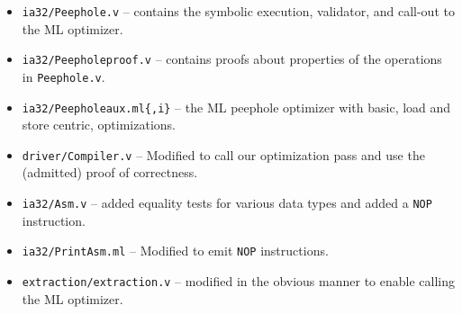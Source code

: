 \documentclass{article}
\begin{document}
\begin{itemize}
\item {\tt ia32/Peephole.v} -- contains the symbolic execution,
  validator, and call-out to the ML optimizer.
\item {\tt ia32/Peepholeproof.v} -- contains proofs about
  properties of the operations in {\tt Peephole.v}.
\item {\tt ia32/Peepholeaux.ml\{,i\}} -- the ML peephole
  optimizer with basic, load and store centric, optimizations.
\item {\tt driver/Compiler.v} -- Modified to call our
  optimization pass and use the (admitted) proof of correctness.
\item {\tt ia32/Asm.v} -- added equality tests for various data
  types and added a {\tt NOP} instruction.
\item {\tt ia32/PrintAsm.ml} -- Modified to emit {\tt NOP} instructions.
\item {\tt extraction/extraction.v} -- modified in the obvious
  manner to enable calling the ML optimizer.
\end{itemize}
\end{document}
